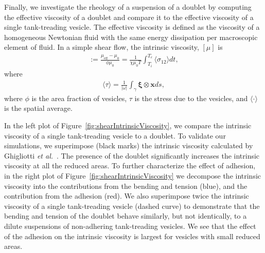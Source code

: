 \documentclass[prf,superscriptaddress,showpacs]{revtex4-1}
\newcommand{\xx}{\mathbf{x}}
\newcommand{\xxi}{\boldsymbol{\xi}}
\begin{document}
Finally, we investigate the rheology of a suspension of a doublet by
computing the effective viscosity of a doublet and compare it to the
effective viscosity of a single tank-treading vesicle. The effective
viscosity is defined as the viscosity of a homogeneous Newtonian fluid
with the same energy dissipation per macroscopic element of fluid.  In a
simple shear flow, the intrinsic viscosity, $[\mu]$ is
\begin{align*}
  [\mu]:= \frac{\mu_{\mathrm{eff}} - \mu_0}{\phi \mu_0} = 
  \frac{1}{\chi \mu_0 T} \int_{T_i}^{T_e} 
  \langle \sigma_{12} \rangle dt,
\end{align*}
where
\begin{align*}
  \langle \tau \rangle = \frac{1}{|\omega|} \int_{\gamma}
    \xxi \otimes \xx ds,
\end{align*}
where $\phi$ is the area fraction of vesicles, $\tau$ is the stress due
to the vesicles, and $\langle \cdot \rangle$ is the spatial average.

In the left plot of Figure~\ref{fig:shearIntrinsicViscosity}, we compare
the intrinsic viscosity of a single tank-treading vesicle to a doublet.
To validate our simulations, we superimpose (black marks) the intrinsic
viscosity calculated by Ghigliotti {\em et
al.}~\cite{GhigliottiBibenMisbah2010_JFM}.  The presence of the doublet
significantly increases the intrinsic viscosity at all the reduced
areas.  To further characterize the effect of adhesion, in the right
plot of Figure~\ref{fig:shearIntrinsicViscosity} we decompose the
intrinsic viscosity into the contributions from the bending and tension
(blue), and the contribution from the adhesion (red).  We also
superimpose twice the intrinsic viscosity of a single tank-treading
vesicle (dashed curve) to demonstrate that the bending and tension of
the doublet behave similarly, but not identically, to a dilute
suspensions of non-adhering tank-treading vesicles.  We see that the
effect of the adhesion on the intrinsic viscosity is largest for
vesicles with small reduced areas.
\end{document}
